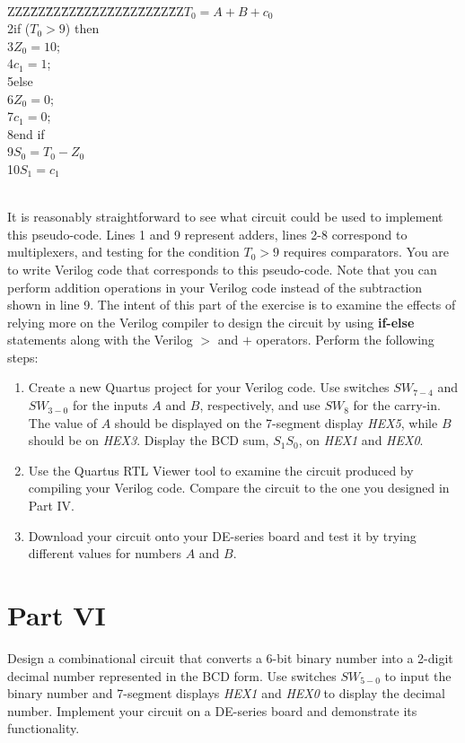 \documentclass[epsfig,10pt,fullpage]{article}
\newcommand{\CommonDocsPath}{../../../common/docs}
\begin{document}
~\\
\begin{center}
\begin{minipage}[t]{12.5 cm}
\begin{tabbing}
ZZZ\=ZZ\=ZZ\=ZZ\=ZZ\=ZZ\=ZZ\=ZZ\=ZZ\=ZZ\=ZZ\>$T_0 = A + B + c_0$ \\
2\>if ($T_0 > 9$) then\\
3\>\>$Z_0 = 10$;\\
4\>\>$c_1 = 1$;\\
5\>else\\
6\>\>$Z_0 = 0$;\\
7\>\>$c_1 = 0$;\\
8\>end if\\
9\>$S_0 = T_0 - Z_0$\\
10\>$S_1 = c_1$\\
\end{tabbing}
\end{minipage}
\end{center}
~\\
It is reasonably straightforward to see what circuit could be used to implement this
pseudo-code. Lines 1 and 9 represent adders, lines 2-8 correspond to
multiplexers, and testing for the condition $T_0 > 9$ requires comparators.
You are to write Verilog code that corresponds to this pseudo-code. Note that you can
perform addition operations in your Verilog code instead of the subtraction shown 
in line 9. The intent of this part of the exercise is
to examine the effects of relying more on the Verilog compiler to design the circuit by using
{\bf if-else} statements along with the Verilog $>$ and $+$ operators. 
Perform the following steps:

\begin{enumerate}
\item Create a new Quartus project for your Verilog code. Use switches $SW_{7-4}$ and $SW_{3-0}$ for the inputs $A$ and $B$, respectively, and
use $SW_{8}$ for the carry-in.
The value of $A$ should be displayed on the 7-segment display {\it HEX5}, 
while $B$ should be on {\it HEX3}.
Display the BCD sum, $S_1 S_0$, on {\it HEX1} and {\it HEX0}.
\item Use the Quartus RTL Viewer tool to examine the circuit produced by compiling your
Verilog code. Compare the circuit to the one you designed in Part IV.
\item Download your circuit onto your DE-series board and test it by trying different values for 
numbers $A$ and $B$.
\end{enumerate}

\section*{Part VI}
Design a combinational circuit that converts a 6-bit binary number into 
a 2-digit decimal number represented in the BCD form. 
Use switches $SW_{5-0}$ to input the binary number and 7-segment displays 
{\it HEX1} and {\it HEX0} to display the decimal number.
Implement your circuit on a DE-series board and demonstrate its functionality.


\end{document}
